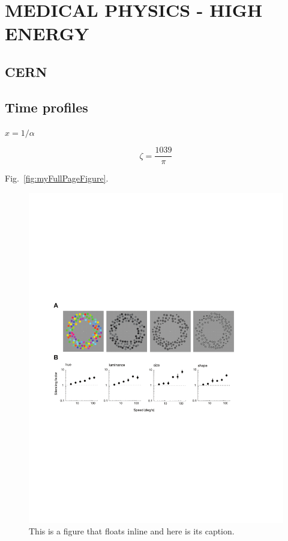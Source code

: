 \section{MEDICAL PHYSICS - HIGH ENERGY}
\subsection{CERN}
\subsection{Time profiles}



$x = 1/\alpha$ 

\cite{Eigen1971, Knuth1968}

$$\zeta = \frac{1039}{\pi}$$

Fig.~\ref{fig:myFullPageFigure}.

\begin{figure}  
\includegraphics[width=\textwidth]{figures/fig1}
\caption[Short figure name.]{This is a figure that floats inline and here is its caption.
\label{fig:myInlineFigure}}
\end{figure}

\afterpage{\clearpage}


